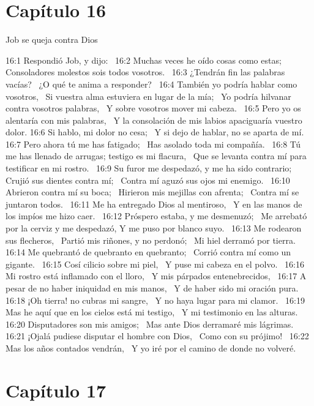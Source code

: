 \section*{Capítulo 16 }
Job se queja contra Dios  

16:1 Respondió Job, y dijo:  
16:2 Muchas veces he oído cosas como estas;  
Consoladores molestos sois todos vosotros.  
16:3 ¿Tendrán fin las palabras vacías?  
¿O qué te anima a responder?  
16:4 También yo podría hablar como vosotros,  
Si vuestra alma estuviera en lugar de la mía;  
Yo podría hilvanar contra vosotros palabras,  
Y sobre vosotros mover mi cabeza.  
16:5 Pero yo os alentaría con mis palabras,  
Y la consolación de mis labios apaciguaría vuestro dolor. 
16:6 Si hablo, mi dolor no cesa;  
Y si dejo de hablar, no se aparta de mí.  
16:7 Pero ahora tú me has fatigado;  
Has asolado toda mi compañía.  
16:8 Tú me has llenado de arrugas; testigo es mi flacura,  
Que se levanta contra mí para testificar en mi rostro.  
16:9 Su furor me despedazó, y me ha sido contrario;  
Crujió sus dientes contra mí;  
Contra mí aguzó sus ojos mi enemigo.  
16:10 Abrieron contra mí su boca;  
Hirieron mis mejillas con afrenta;  
Contra mí se juntaron todos.  
16:11 Me ha entregado Dios al mentiroso,  
Y en las manos de los impíos me hizo caer.  
16:12 Próspero estaba, y me desmenuzó;  
Me arrebató por la cerviz y me despedazó, 
Y me puso por blanco suyo.  
16:13 Me rodearon sus flecheros,  
Partió mis riñones, y no perdonó;  
Mi hiel derramó por tierra.  
16:14 Me quebrantó de quebranto en quebranto;  
Corrió contra mí como un gigante.  
16:15 Cosí cilicio sobre mi piel,  
Y puse mi cabeza en el polvo.  
16:16 Mi rostro está inflamado con el lloro,  
Y mis párpados entenebrecidos,  
16:17 A pesar de no haber iniquidad en mis manos,  
Y de haber sido mi oración pura.  
16:18 ¡Oh tierra! no cubras mi sangre,  
Y no haya lugar para mi clamor.  
16:19 Mas he aquí que en los cielos está mi testigo,  
Y mi testimonio en las alturas.  
16:20 Disputadores son mis amigos;  
Mas ante Dios derramaré mis lágrimas.  
16:21 ¡Ojalá pudiese disputar el hombre con Dios,  
Como con su prójimo!  
16:22 Mas los años contados vendrán,  
Y yo iré por el camino de donde no volveré.  
\section*{Capítulo 17}

